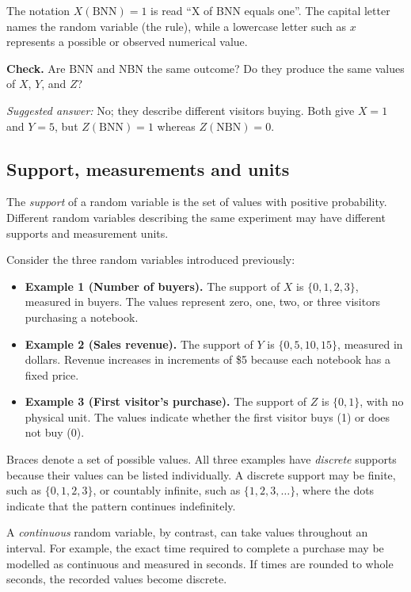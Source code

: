 The notation $X(\mathrm{BNN})=1$ is read ``X of BNN equals one''. The capital letter names the random variable (the rule), while a lowercase letter such as $x$ represents a possible or observed numerical value.

\textbf{Check.} Are BNN and NBN the same outcome? Do they produce the same values of $X$, $Y$, and $Z$?

\emph{Suggested answer:} No; they describe different visitors buying. Both give $X=1$ and $Y=5$, but $Z(\mathrm{BNN})=1$ whereas $Z(\mathrm{NBN})=0$.


\subsection{Support, measurements and units}

The \emph{support} of a random variable is the set of values with positive probability. Different random variables describing the same experiment may have different supports and measurement units.

Consider the three random variables introduced previously:

\begin{itemize}
	\item \textbf{Example 1 (Number of buyers).}
	The support of $X$ is $\{0,1,2,3\}$, measured in buyers.
	The values represent zero, one, two, or three visitors
	purchasing a notebook.
	
	\item \textbf{Example 2 (Sales revenue).}
	The support of $Y$ is $\{0,5,10,15\}$, measured in dollars.
	Revenue increases in increments of \$5 because each
	notebook has a fixed price.
	
	\item \textbf{Example 3 (First visitor's purchase).}
	The support of $Z$ is $\{0,1\}$, with no physical unit.
	The values indicate whether the first visitor buys (1)
	or does not buy (0).
\end{itemize}

Braces denote a set of possible values. All three examples have \emph{discrete} supports because their values can be listed individually. A discrete support may be finite, such as $\{0,1,2,3\}$, or countably infinite, such as $\{1,2,3,\ldots\}$, where the dots indicate that the pattern continues indefinitely.

A \emph{continuous} random variable, by contrast, can take values throughout an interval. For example, the exact time required to complete a purchase may be modelled as continuous and measured in seconds. If times are rounded to whole seconds, the recorded values become discrete.


